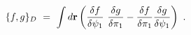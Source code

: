 \begin{equation}
\{f,g\}_{D}\ =\ \int d{\bf r}\left( {\frac{\delta f}{\delta \psi _{1}}}{\ 
\frac{\delta g}{\delta \pi _{1}}}-{\frac{\delta f}{\delta \pi _{1}}}{\frac{%
\delta g}{\delta \psi _{1}}}\right) \ .  \label{DBPB}
\end{equation}%
